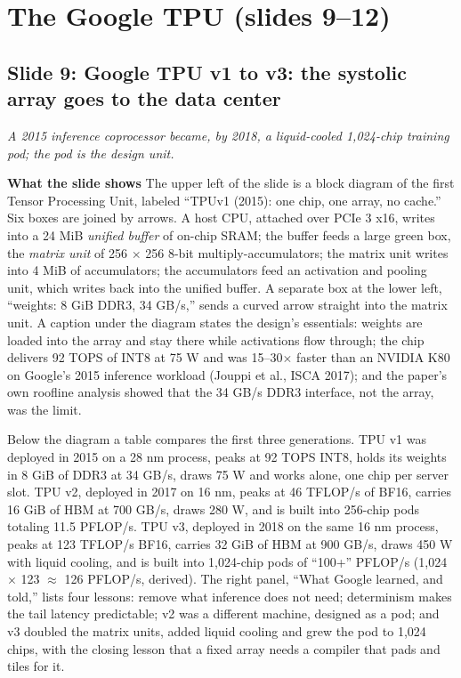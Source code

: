 \documentclass[11pt,letterpaper]{article}
\newcommand{\slide}[3]{%
  \subsection[Slide #1: #2]{Slide #1: #2}%
  {\color{muted}\itshape #3\par}\medskip}
\newcommand{\para}[1]{\medskip\noindent\textbf{#1}\quad}
\begin{document}
\section{The Google TPU (slides 9--12)}

\slide{9}{Google TPU v1 to v3: the systolic array goes to the data center}{A 2015 inference coprocessor became, by 2018, a liquid-cooled 1,024-chip training pod; the pod is the design unit.}

\para{What the slide shows} The upper left of the slide is a block diagram of the first Tensor Processing Unit, labeled ``TPUv1 (2015): one chip, one array, no cache.'' Six boxes are joined by arrows. A host CPU, attached over PCIe 3 x16, writes into a 24 MiB \emph{unified buffer} of on-chip SRAM; the buffer feeds a large green box, the \emph{matrix unit} of 256 $\times$ 256 8-bit multiply-accumulators; the matrix unit writes into 4 MiB of accumulators; the accumulators feed an activation and pooling unit, which writes back into the unified buffer. A separate box at the lower left, ``weights: 8 GiB DDR3, 34 GB/s,'' sends a curved arrow straight into the matrix unit. A caption under the diagram states the design's essentials: weights are loaded into the array and stay there while activations flow through; the chip delivers 92 TOPS of INT8 at 75 W and was 15--30$\times$ faster than an NVIDIA K80 on Google's 2015 inference workload (Jouppi et al., ISCA 2017); and the paper's own roofline analysis showed that the 34 GB/s DDR3 interface, not the array, was the limit.

Below the diagram a table compares the first three generations. TPU v1 was deployed in 2015 on a 28 nm process, peaks at 92 TOPS INT8, holds its weights in 8 GiB of DDR3 at 34 GB/s, draws 75 W and works alone, one chip per server slot. TPU v2, deployed in 2017 on 16 nm, peaks at 46 TFLOP/s of BF16, carries 16 GiB of HBM at 700 GB/s, draws 280 W, and is built into 256-chip pods totaling 11.5 PFLOP/s. TPU v3, deployed in 2018 on the same 16 nm process, peaks at 123 TFLOP/s BF16, carries 32 GiB of HBM at 900 GB/s, draws 450 W with liquid cooling, and is built into 1{,}024-chip pods of ``100+'' PFLOP/s (1{,}024 $\times$ 123 $\approx$ 126 PFLOP/s, derived). The right panel, ``What Google learned, and told,'' lists four lessons: remove what inference does not need; determinism makes the tail latency predictable; v2 was a different machine, designed as a pod; and v3 doubled the matrix units, added liquid cooling and grew the pod to 1{,}024 chips, with the closing lesson that a fixed array needs a compiler that pads and tiles for it.
\end{document}
